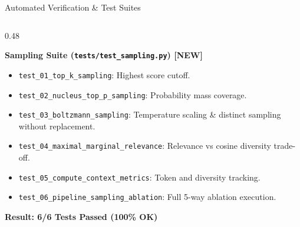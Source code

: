 \documentclass[10pt,aspectratio=169]{beamer}
\begin{document}
\begin{frame}{Automated Verification \& Test Suites}
\begin{columns}[onlytextwidth,T]
        \begin{column}{0.48\textwidth}
            \begin{block}{\textbf{Sampling Suite (\texttt{tests/test\_sampling.py}) [NEW]}}
                \scriptsize
                \begin{itemize}\setlength\itemsep{1pt}
                    \item \texttt{test\_01\_top\_k\_sampling}: Highest score cutoff.
                    \item \texttt{test\_02\_nucleus\_top\_p\_sampling}: Probability mass coverage.
                    \item \texttt{test\_03\_boltzmann\_sampling}: Temperature scaling \& distinct sampling without replacement.
                    \item \texttt{test\_04\_maximal\_marginal\_relevance}: Relevance vs cosine diversity trade-off.
                    \item \texttt{test\_05\_compute\_context\_metrics}: Token and diversity tracking.
                    \item \texttt{test\_06\_pipeline\_sampling\_ablation}: Full 5-way ablation execution.
                \end{itemize}
                \vspace{0.08cm}
                \textcolor{accentgreen}{\textbf{Result: 6/6 Tests Passed (100\% OK)}}
            \end{block}
        \end{column}
    \end{columns}
\end{frame}
\end{document}
